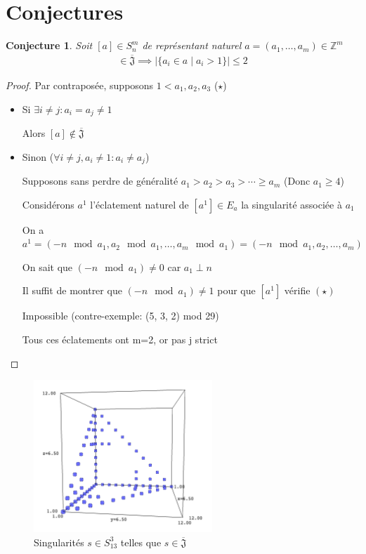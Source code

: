 \documentclass{article}
\newtheorem{conjecture}{Conjecture}
\begin{document}
\newpage

\section{Conjectures}

\begin{conjecture}
    Soit $[a] \in S_n^m$ de représentant naturel $a = (a_1, \dots, a_m) \in \mathbb{Z}^m$
    \begin{align*}
        [a] \in \overline{\mathfrak{J}} \implies |\{ a_i \in a \mid a_i > 1 \}| \leq 2
    \end{align*}
\end{conjecture}

\begin{proof}
    Par contraposée, supposons $1 < a_1, a_2, a_3$ ($\star$)

    \begin{itemize}
        \item Si $\exists i \neq j : a_i = a_j \neq 1$
        
            Alors $[a] \not \in \overline{\mathfrak{J}}$
        \item Sinon ($\forall i \neq j, a_i \neq 1 : a_i \neq a_j$)
        
            Supposons sans perdre de généralité $a_1 > a_2 > a_3 > \cdots \geq a_m$ (Donc $a_1 \geq 4$)

            Considérons $a^1$ l'éclatement naturel de $[a^1] \in E_a$ la singularité associée à $a_1$

            On a $a^1 = (-n \mod {a_1}, a_2 \mod {a_1}, \dots, a_m \mod {a_1}) = (-n \mod {a_1}, a_2, \dots, a_m)$

            On sait que $(-n \mod {a_1}) \neq 0$ car $a_1 \perp n$

            Il suffit de montrer que $(-n \mod {a_1}) \neq 1$ pour que $[a^1]$ vérifie $(\star)$

            Impossible (contre-exemple: (5, 3, 2) mod 29)

            Tous ces éclatements ont m=2, or pas j strict
    \end{itemize}
\end{proof}

\begin{figure}[h]
    \caption{Singularités $s \in S_{13}^3$ telles que $s \in \overline{\mathfrak{J}}$}
    \centering
    \includegraphics[width=0.6\textwidth]{singularite_j_strict_m3_n13}
\end{figure}
\end{document}
